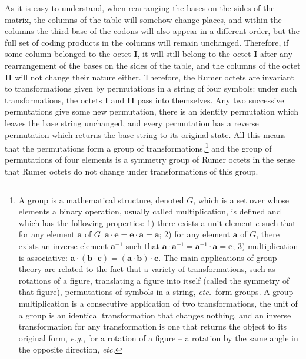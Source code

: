 \documentclass[12pt]{article}
\begin{document}
As it is easy to understand, when rearranging the bases on the sides of the matrix, the columns of the table will somehow change places, and within the columns the third base of the codons will also appear in a different order, but the full set of coding products in the columns will remain unchanged. Therefore, if some column belonged to the octet \textbf{I}, it will still belong to the octet \textbf{I} after any rearrangement of the bases on the sides of the table, and the columns of the octet \textbf{II} will not change their nature either. Therefore, the Rumer octets are invariant to transformations given by permutations in a string of four symbols: under such transformations, the octets \textbf{I} and \textbf{II} pass into themselves. Any two successive permutations give some new permutation, there is an identity permutation which leaves the base string unchanged, and every permutation has a reverse permutation which returns the base string to its original state. All this means that the permutations form a group of transformations,\footnote{A group is a mathematical structure, denoted $G$, which is a set over whose elements a binary operation, usually called multiplication, is defined and which has the following properties: 1) there exists a unit element $e$ such that for any element $\boldsymbol{a}$ of $G$\ $\boldsymbol{a} \cdot \boldsymbol{e} = \boldsymbol{e} \cdot \boldsymbol{a} = \boldsymbol{a}$; 2) for any element $\boldsymbol{a}$ of $G$, there exists an inverse element $\boldsymbol{a}^{-1}$ such that $\boldsymbol{a} \cdot \boldsymbol{a}^{-1} = \boldsymbol{a}^{-1} \cdot \boldsymbol{a} = \boldsymbol{e}$; 3) multiplication is associative: $\boldsymbol{a} \cdot (\boldsymbol{b} \cdot \boldsymbol{c}) = (\boldsymbol{a} \cdot \boldsymbol{b}) \cdot \boldsymbol{c}$. The main applications of group theory are related to the fact that a variety of transformations, such as rotations of a figure, translating a figure into itself (called the symmetry of that figure), permutations of symbols in a string, \textit{etc.}\ form groups. A group multiplication is a consecutive application of two transformations, the unit of a group is an identical transformation that changes nothing, and an inverse transformation for any transformation is one that returns the object to its original form, \textit{e.g.}, for a rotation of a figure -- a rotation by the same angle in the opposite direction, \textit{etc.}} and the group of permutations of four elements is a symmetry group of Rumer octets in the sense that Rumer octets do not change under transformations of this group.
\end{document}

